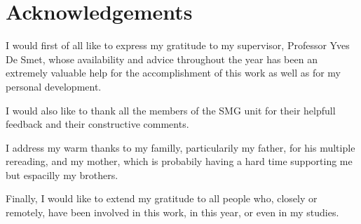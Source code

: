 \chapter*{\centering Acknowledgements}

I would first of all like to express my gratitude to my supervisor, Professor Yves De Smet, whose availability and advice throughout the year has been an extremely valuable help for the accomplishment of this work as well as for my personal development. 

\vskip 1cm
I would also like to thank all the members of the SMG unit for their helpfull feedback and their constructive comments.

\vskip 1cm
I address my warm thanks to my familly, particularily my father, for his multiple rereading, and my mother, which is probabily having a hard time supporting me but espacilly my brothers.


\vskip 1cm
Finally, I would like to extend my gratitude to all people who, closely or remotely, have been involved in this work, in this year, or even in my studies.
